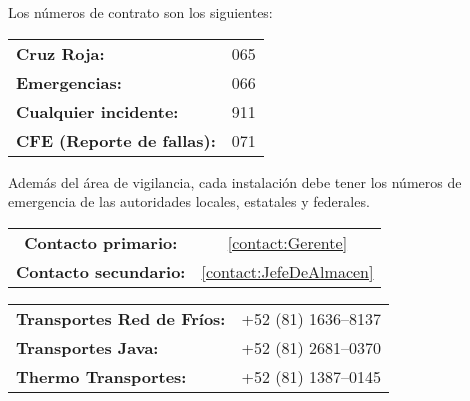 \begin{contact} \label{contact:NumerosDeEmergencia}
	Los números de contrato son los siguientes:\\
	\begin{tabular}{lc}
		\textbf{Cruz Roja:}               & 065 \\
		\textbf{Emergencias:}             & 066 \\
		\textbf{Cualquier incidente:}     & 911 \\
		\textbf{CFE (Reporte de fallas):} & 071
	\end{tabular}
\end{contact}

Además del área de vigilancia, cada instalación debe tener los números de emergencia de las autoridades locales, estatales y federales.

\begin{tabular}{cc}
	\noindent \textbf{Contacto primario:} & \cref{contact:Gerente}       \\
	\textbf{Contacto secundario:}         & \cref{contact:JefeDeAlmacen}
\end{tabular}

\begin{contact} \label{contact:TransportesEnCasoDeAveria}
	\begin{tabular}{lc}
		\textbf{Transportes Red de Fríos:} & +52 (81) 1636--8137 \\
		\textbf{Transportes Java:}         & +52 (81) 2681--0370 \\
		\textbf{Thermo Transportes:}       & +52 (81) 1387--0145
	\end{tabular}
\end{contact}